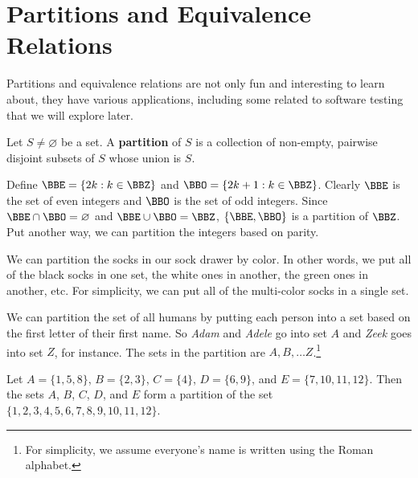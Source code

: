 \newpage
\section{Partitions and Equivalence Relations}\label{section:parts}
Partitions and equivalence relations are not only fun and
interesting to learn about, they have various applications,
including some related to software testing that we will explore later.  

\begin{df}
Let $S \neq \varnothing$ be a set. A {\bf partition}
of $S$ is a collection of non-empty, pairwise  disjoint
subsets  of $S$ whose union is $S$.
\end{df}

\begin{exa}\label{exa:parityPartex}
Define $\BBE=\{2k:k\in \BBZ\}$ and $\BBO=\{2k+1:k\in \BBZ\}$.  Clearly $\BBE$ is the set of
even integers and $\BBO$ is the set of odd integers.
Since $\BBE\cap\BBO=\varnothing$ and  $\BBE\cup\BBO=\BBZ$,
$\{\BBE, \BBO\}$ is a partition of $\BBZ$.
Put another way, we can partition the integers based on parity.
\label{ex:mod2}
\end{exa}

\begin{exa}\label{exa:socksPart}
We can partition the socks in our sock drawer by color.  In other words, we put all of the
black socks in one set, the white ones in another, the green ones in another, etc.
For simplicity, we can put all of the multi-color socks in a single set.
\end{exa}


\begin{exa}\label{exa:peoplePart}
We can partition the set of all humans by putting each person into a set based on the first
letter of their first name.  So {\em Adam} and {\em Adele} go into set $A$ 
and {\em Zeek} goes into set $Z$, for instance.  The sets in the partition are 
$A, B, \ldots Z$.\footnote{For simplicity, we assume everyone's name is written using the Roman alphabet.}
\end{exa}

\begin{exa}\label{exa:weirdPart}
Let $A=\{1, 5, 8\}$, $B=\{2, 3\}$, $C=\{4\}$, $D=\{6, 9\}$, and $E=\{7, 10, 11, 12\}$.
Then the sets $A$, $B$, $C$, $D$, and $E$ form a partition of the set
$\{1, 2, 3, 4, 5, 6, 7, 8, 9, 10, 11, 12\}$.
\end{exa}



